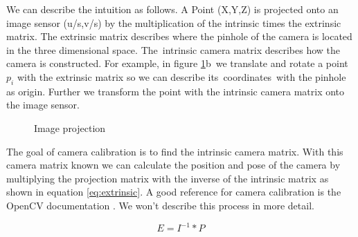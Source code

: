 \documentclass[11pt,a4paper,titlepage,oneside]{report}
\begin{document}
We can describe the intuition as follows. A Point (X,Y,Z) is projected onto an image sensor (u/s,v/s) by the multiplication of the intrinsic times the extrinsic matrix. The extrinsic matrix describes where the pinhole of the camera is located in the three dimensional space. The intrinsic camera matrix describes how the camera is constructed. For example, in figure \ref{fig:projection}b we translate and rotate a point $p_i$ with the extrinsic matrix so we can describe its coordinates with the pinhole as origin. Further we transform the point with the intrinsic camera matrix onto the image sensor.

\begin{figure}[H]
	\centering
	\caption{Image projection}\label{fig:projection}
\end{figure}

The goal of camera calibration is to find the intrinsic camera matrix. With this camera matrix known we can calculate the position and pose of the camera by multiplying the projection matrix with the inverse of the intrinsic matrix as shown in equation \ref{eq:extrinsic}. A good reference for camera calibration is the OpenCV documentation \cite{opencv_calib}. We won't describe this process in more detail.

\begin{equation}\label{eq:extrinsic}
	E=I^{-1}*P
\end{equation}
\end{document}
